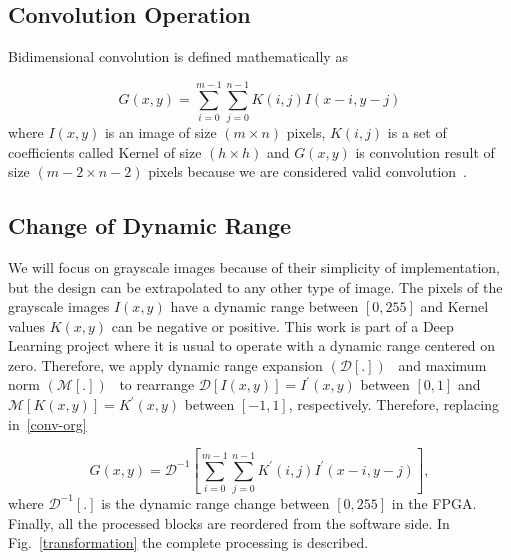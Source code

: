 \documentclass[conference,compsoc]{IEEEtran}
\begin{document}
\subsection{Convolution Operation}

Bidimensional convolution is defined mathematically as

\begin{equation}\label{conv-org}
  G(x,y) = \sum_{i=0}^{m-1} \sum_{j=0}^{n-1}K(i,j)I(x-i,y-j)
\end{equation}
where $I(x,y)$ is an image of size $(m \times n)$ pixels, $K(i,j)$ is a set of
coefficients called Kernel of size $(h \times h)$ and $G(x,y)$ is convolution
result of size $(m-2 \times n-2)$ pixels because we are considered valid
convolution~\cite{validconv}. 

\subsection{Change of Dynamic Range}

We will focus on grayscale images because of their simplicity of implementation,
but the design can be extrapolated to any other type of image. The pixels of the
grayscale images $I(x,y)$ have a dynamic range between $[0,255]$ and Kernel
values $K(x,y)$ can be negative or positive. This work is part of a Deep
Learning project where it is usual to operate with a dynamic range centered on
zero. Therefore, we apply dynamic range expansion $(\mathcal{D}[.])$~\cite{dinamic_rango} and
maximum norm $(\mathcal{M}[.])$~\cite{max_norm} to rearrange $\mathcal{D}[I(x,y)]=I^\prime(x,y)$
between $[0,1]$ and $\mathcal{M}[K(x,y)]=K^\prime(x,y)$ between $[-1,1]$,
respectively. Therefore, replacing in~\eqref{conv-org}

\begin{equation}\label{conv-org1}
  G(x,y) = \mathcal{D}^{-1}\left[\sum_{i=0}^{m-1} \sum_{j=0}^{n-1}K^\prime(i,j)I^\prime(x-i,y-j)\right],
\end{equation}
where $\mathcal{D}^{-1}[.]$ is the dynamic range change between $[0,255]$ in the
FPGA. Finally, all the processed blocks are reordered from the software side. In
Fig.~\ref{transformation} the complete processing is described.
\end{document}
